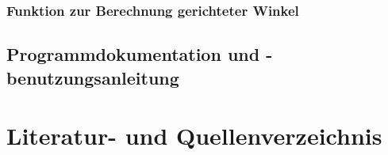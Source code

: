 \documentclass[reducespace,stylepage,semiarbeit]{spezidoc}
\begin{document}
\begin{equation*}
\begin{split}
\end{split}
\end{equation*}

\begin{subequations}
\begin{align}
\end{align}
\end{subequations}

\subsubsection*{Funktion zur Berechnung gerichteter Winkel}

\subsection{Programmdokumentation und -benutzungsanleitung}

\newpage
\nocite{*}
\section{Literatur- und Quellenverzeichnis}
\printbibliography[type=book, title=Buchquellen]
\printbibliography[type=online, title=Internetquellen]


\eidesstattlicheerklaerung
\end{document}
